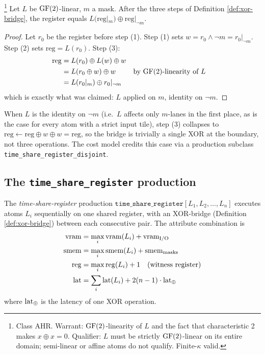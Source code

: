 \begin{proposition}
  \label{prop:xor-bridge}
  \footnote{Class \textsf{AHR}. Warrant:
  $\operatorname{GF}(2)$-linearity of $L$ and the fact that
  characteristic 2 makes $x \oplus x = 0$.
  Qualifier: $L$ must be strictly $\operatorname{GF}(2)$-linear on
  its entire domain; semi-linear or affine atoms do
  not qualify. Finite-$\kappa$ valid.}
  Let $L$ be $\operatorname{GF}(2)$-linear, $m$ a mask. After the
  three steps of Definition \ref{def:xor-bridge}, the
  register equals $L(\mathrm{reg}|_m) \oplus
  \mathrm{reg}|_{\neg m}$.
\end{proposition}

\begin{proof}
  Let $r_0$ be the register before step (1). Step (1)
  sets $w = r_0 \wedge \neg m = r_0|_{\neg m}$. Step
  (2) sets $\mathrm{reg} = L(r_0)$. Step (3):
  \begin{align*}
    \mathrm{reg}
    &= L(r_0) \oplus L(w) \oplus w \\
    &= L(r_0 \oplus w) \oplus w
      && \text{by $\operatorname{GF}(2)$-linearity of $L$} \\
    &= L(r_0|_m) \oplus r_0|_{\neg m}
  \end{align*}
  which is exactly what was claimed: $L$ applied on
  $m$, identity on $\neg m$.
\end{proof}

\begin{remark}
  When $L$ is the identity on $\neg m$ (i.e.\ $L$
  affects only $m$-lanes in the first place, as is
  the case for every atom with a strict input tile),
  step (3) collapses to $\mathrm{reg} \leftarrow
  \mathrm{reg} \oplus w \oplus w = \mathrm{reg}$, so
  the bridge is trivially a single XOR at the
  boundary, not three operations. The cost model
  credits this case via a production subclass
  \texttt{time\_share\_register\_disjoint}.
\end{remark}

\subsection{The \texttt{time\_share\_register} production}

\begin{definition}
  \label{def:time-share}
  The \emph{time-share-register} production
  $\texttt{time\_share\_register}[L_1, L_2, \ldots,
  L_n]$ executes atoms $L_i$ sequentially on one
  shared register, with an XOR-bridge
  (Definition \ref{def:xor-bridge}) between each
  consecutive pair. The attribute combination is
  \begin{align}
    \operatorname{vram} &= \max_i \operatorname{vram}(L_i) + \operatorname{vram}_{\mathrm{I/O}} \\
    \operatorname{smem} &= \max_i \operatorname{smem}(L_i) + \operatorname{smem}_{\mathrm{masks}} \\
    \operatorname{reg}  &= \max_i \operatorname{reg}(L_i)  + 1 \quad \text{(witness register)} \\
    \operatorname{lat}  &= \sum_i \operatorname{lat}(L_i) + 2(n-1) \cdot \operatorname{lat}_\oplus
  \end{align}
  where $\operatorname{lat}_\oplus$ is the latency of one XOR
  operation.
\end{definition}

